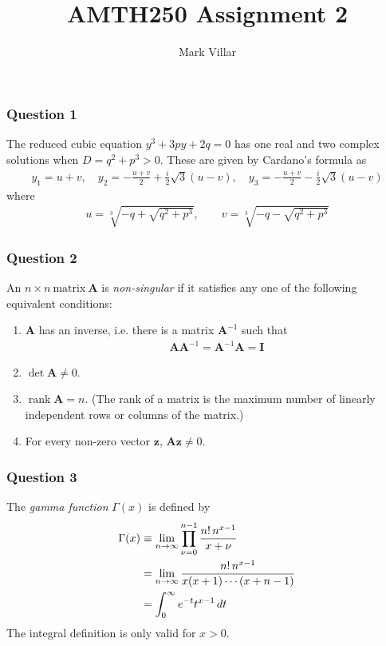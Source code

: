 \documentclass[11pt,a4paper]{article}
\title{AMTH250 \hfill Assignment 2}
\author{Mark Villar}
\begin{document}
\maketitle

\subsubsection*{Question 1}
The reduced cubic equation $y^{3}+3py+2q=0$ has one real and two complex solutions when $D=q^{2}+p^{3}>0$. These are given by Cardano's formula as 
	\begin{align*}
		y_{1}=u+v, \quad y_{2}=-\frac{u+v}{2}+\frac{i}{2}\sqrt{3}(u-v), \quad y_{3}=-\frac{u+v}{2}-\frac{i}{2}\sqrt{3}(u-v)
	\end{align*}
	where
	\begin{align*}
		u=\sqrt[3]{-q+\sqrt{q^{2}+p^{3}}},  \qquad v=\sqrt[3]{-q-\sqrt{q^{2}+p^{3}}}
	\end{align*}

\subsubsection*{Question 2}
An $n \times n \ \text{matrix} \ \mathbf{A}$ is \textsl{non-singular} if it satisfies any one of the following equivalent conditions:
	\begin{enumerate}
		\item $\mathbf{A}$ has an inverse, i.e. there is a matrix $\mathbf{A}^{-1}$ such that 
		\begin{align*}
			\mathbf{AA}^{-1}=\mathbf{A}^{-1}\mathbf{A}=\mathbf{I}
		\end{align*}
		\item $\det \mathbf{A} \neq 0.$

		\item $\operatorname{rank} \mathbf{A} = n$. (The rank of a matrix is the maximum number of linearly independent rows or columns of the matrix.)

		\item For every non-zero vector $\mathbf{z}$, $\mathbf{Az} \neq 0$.

	\end{enumerate}

\subsubsection*{Question 3}
The \textit{gamma function} $\Gamma(x)$ is defined by 
	\begin{align*}
		\Gamma(x) &\equiv \lim_{n \rightarrow \infty} \prod^{n-1}_{\nu=0} \frac{n! \thinspace n^{x-1}}{x+\nu} \\
		&=\lim_{n \rightarrow \infty} \frac{n! \thinspace n^{x-1}}{x(x+1) \cdots (x+n-1)} \\
		&=\int^\infty_0 e^{-t}t^{x-1} \thinspace dt
	\end{align*} 
The integral definition is only valid for $x>0$.
\end{document}
